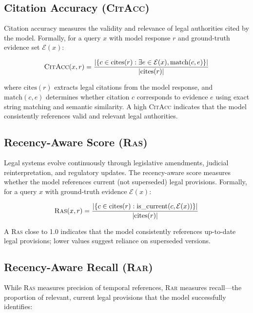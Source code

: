 \documentclass[11pt,a4paper]{article}
\newcommand{\citacc}{\textsc{CitAcc}}
\newcommand{\ras}{\textsc{Ras}}
\newcommand{\rar}{\textsc{Rar}}
\begin{document}
\subsection{Citation Accuracy (\citacc)}

Citation accuracy measures the validity and relevance of legal authorities cited by the model.
Formally, for a query $x$ with model response $r$ and ground-truth evidence set $\mathcal{E}(x)$:

\begin{equation}
    \citacc(x, r) = \frac{|\{c \in \text{cites}(r) : \exists e \in \mathcal{E}(x), \text{match}(c, e)\}|}{|\text{cites}(r)|}
\end{equation}

\noindent where $\text{cites}(r)$ extracts legal citations from the model response, and $\text{match}(c, e)$ determines whether citation $c$ corresponds to evidence $e$ using exact string matching and semantic similarity.
A high \citacc{} indicates that the model consistently references valid and relevant legal authorities.

\subsection{Recency-Aware Score (\ras)}

Legal systems evolve continuously through legislative amendments, judicial reinterpretation, and regulatory updates.
The recency-aware score measures whether the model references current (not superseded) legal provisions.
Formally, for a query $x$ with ground-truth evidence $\mathcal{E}(x)$:

\begin{equation}
    \ras(x, r) = \frac{|\{c \in \text{cites}(r) : \text{is\_current}(c, \mathcal{E}(x))\}|}{|\text{cites}(r)|}
\end{equation}

\noindent A \ras{} close to 1.0 indicates that the model consistently references up-to-date legal provisions; lower values suggest reliance on superseded versions.

\subsection{Recency-Aware Recall (\rar)}

While \ras{} measures precision of temporal references, \rar{} measures recall---the proportion of relevant, current legal provisions that the model successfully identifies:
\end{document}
